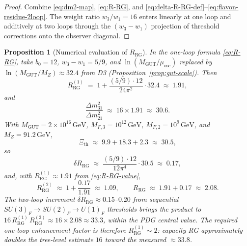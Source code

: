 \documentclass[11pt]{article}
\theoremstyle{plain}
\newtheorem{proposition}[theorem]{Proposition}
\theoremstyle{definition}
\theoremstyle{remark}
\numberwithin{equation}{section}
\begin{document}
\begin{proof}
Combine \eqref{eq:dm2-map}, \eqref{eq:R-RG}, and
\eqref{eq:delta-R-RG-def}--\eqref{eq:flavon-residue-2loop}. The weight ratio
$w_3/w_1=16$ enters linearly at one loop and additively at two loops through
the $(w_3-w_1)$ projection of threshold corrections onto the observer diagonal.
\end{proof}

\begin{proposition}[Numerical evaluation of $R_{\mathrm{RG}}$]
\label{prop:R-RG-numeric}
In the one-loop formula \eqref{eq:R-RG}, take $b_0=12$,
$w_3-w_1=5/9$, and $\ln(M_{\mathrm{GUT}}/\mu_{\mathrm{osc}})$ replaced by
$\ln(M_{\mathrm{GUT}}/M_Z)\approx 32.4$ from D3
(Proposition~\ref{prop:gut-scale}). Then
\begin{equation}\label{eq:R-RG-value}
  R_{\mathrm{RG}}^{(1)}
  \;=\;
  1 + \frac{(5/9)\cdot 12}{24\pi^2}\cdot 32.4
  \;\approx\;
  1.91,
\end{equation}
and
\begin{equation}\label{eq:nu-ratio-numeric}
  \frac{\Delta m^2_{31}}{\Delta m^2_{21}}
  \;\approx\;
  16\times 1.91
  \;\approx\;
  30.6.
\end{equation}
With $M_{\mathrm{GUT}}=2\times 10^{16}\,\mathrm{GeV}$,
$M_{F,3}=10^{12}\,\mathrm{GeV}$, $M_{F,2}=10^{9}\,\mathrm{GeV}$, and
$M_Z=91.2\,\mathrm{GeV}$,
\begin{equation}\label{eq:Xi-th-value}
  \Xi_{\mathrm{th}}
  \;\approx\;
  9.9 + 18.3 + 2.3
  \;\approx\;
  30.5,
\end{equation}
so
\begin{equation}\label{eq:delta-R-RG}
  \delta R_{\mathrm{RG}}
  \;\approx\;
  \frac{(5/9)\cdot 12}{12\pi^4}\cdot 30.5
  \;\approx\;
  0.17,
\end{equation}
and, with $R_{\mathrm{RG}}^{(1)}\approx 1.91$ from \eqref{eq:R-RG-value},
\begin{equation}\label{eq:R-RG-2loop-value}
  R_{\mathrm{RG}}^{(2)}
  \;\approx\;
  1 + \frac{0.17}{1.91}
  \;\approx\;
  1.09,
  \qquad
  R_{\mathrm{RG}}
  \;\approx\;
  1.91 + 0.17
  \;\approx\;
  2.08.
\end{equation}
The two-loop increment $\delta R_{\mathrm{RG}}\approx 0.15$--$0.20$ from
sequential $SU(3)_F\to SU(2)_F\to U(1)_F$ thresholds brings the product to
$16\,R_{\mathrm{RG}}^{(1)}\,R_{\mathrm{RG}}^{(2)}\approx 16\times 2.08
\approx 33.3$, within the PDG central value. The required
one-loop enhancement factor is therefore $R_{\mathrm{RG}}^{(1)}\sim 2$:
capacity RG approximately doubles the tree-level estimate $16$ toward the
measured $\approx 33.8$.
\end{proposition}
\end{document}
